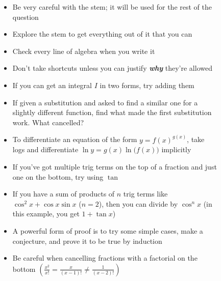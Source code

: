 \documentclass[../main.tex]{subfile}
\begin{document}

\begin{figure}[h]
\centering
\begin{minipage}{0.85\linewidth}


\begin{itemize}
	\item Be very careful with the stem; it will be used for the rest of the question
	\item Explore the stem to get everything out of it that you can
	\item Check every line of algebra when you write it
	\item Don't take shortcuts unless you can justify {\Large\textit{\textbf{why}}} they're allowed
\end{itemize}


\begin{itemize}
	\item If you can get an integral $I$ in two forms, try adding them
	\item If given a substitution and asked to find a similar one for a slightly different function, find what made the first substitution work. What cancelled?
	\item To differentiate an equation of the form $y = f(x)^{g(x)}$, take logs and differentiate $\ln y = g(x) \ln\big(f(x)\big)$ implicitly
\end{itemize}


\begin{itemize}
	\item If you've got multiple trig terms on the top of a fraction and just one on the bottom, try using $\tan$
	\item If you have a sum of products of $n$ trig terms like $\cos^2 x + \cos x\sin x$ ($n = 2$), then you can divide by $\cos^n x$ (in this example, you get $1 + \tan x$)
\end{itemize}


\begin{itemize}
	\item A powerful form of proof is to try some simple cases, make a conjecture, and prove it to be true by induction
\end{itemize}


\begin{itemize}
	\item Be careful when cancelling fractions with a factorial on the bottom $\displaystyle \left(\frac{x^2}{x!} = \frac{x}{(x - 1)!} \ne \frac{1}{(x - 2)!}\right)$
\end{itemize}

\end{minipage}
\end{figure}
\end{document}
